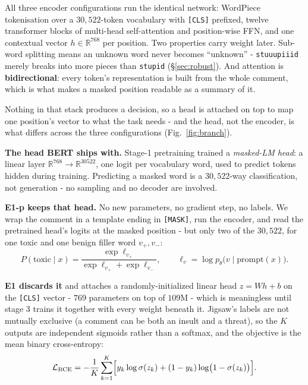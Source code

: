 \documentclass[10pt,a4paper]{article}
\begin{document}
All three encoder configurations run the identical network: WordPiece tokenisation
over a $30{,}522$-token vocabulary with \texttt{[CLS]} prefixed, twelve transformer
blocks of multi-head self-attention and position-wise FFN, and one contextual vector
$h\in\mathbb{R}^{768}$ per position. Two properties carry weight later. Sub-word
splitting means an unknown word never becomes ``unknown'' - \texttt{stuuupiiid}
merely breaks into more pieces than \texttt{stupid} (\S\ref{sec:robust}). And
attention is \textbf{bidirectional}: every token's representation is built from the
whole comment, which is what makes a masked position readable as a summary of it.

Nothing in that stack produces a decision, so a head is attached on top to map one
position's vector to what the task needs - and the head, not the encoder, is what differs
across the three configurations (Fig.~\ref{fig:branch}).

\textbf{The head BERT ships with.} Stage-1 pretraining trained a \emph{masked-LM head}: a
linear layer $\mathbb{R}^{768}\to\mathbb{R}^{30522}$, one logit per vocabulary word, used
to predict tokens hidden during training. Predicting a masked word is a $30{,}522$-way
classification, not generation - no sampling and no decoder are involved.

\textbf{E1-p keeps that head.} No new parameters, no gradient step, no labels. We wrap the
comment in a template ending in \texttt{[MASK]}, run the encoder, and read the pretrained
head's logits at the masked position - but only two of the $30{,}522$, for one toxic and
one benign filler word $v_+,v_-$:
\begin{equation}
P(\text{toxic}\mid x)=\frac{\exp \ell_{v_+}}{\exp \ell_{v_+}+\exp \ell_{v_-}},
\qquad \ell_v = \log p_\theta\bigl(v \mid \text{prompt}(x)\bigr).
\label{eq:mlmprompt}
\end{equation}

\textbf{E1 discards it} and attaches a randomly-initialized linear head $z = Wh+b$ on the
\texttt{[CLS]} vector - $769$ parameters on top of $109$M - which is meaningless until
stage 3 trains it together with every weight beneath it. Jigsaw's labels are not mutually
exclusive (a comment can be both an insult and a threat), so the $K$ outputs are
independent sigmoids rather than a softmax, and the objective is the mean binary
cross-entropy:
\begin{equation}
\mathcal{L}_{\text{BCE}} = -\frac{1}{K}\sum_{k=1}^{K}
\Bigl[y_k \log \sigma(z_k) + (1-y_k)\log\bigl(1-\sigma(z_k)\bigr)\Bigr].
\label{eq:bce}
\end{equation}
\end{document}
